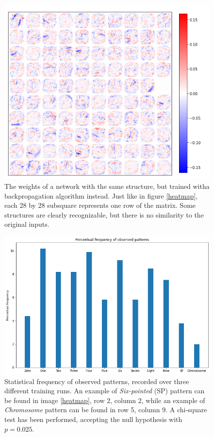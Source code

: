 \documentclass[a4paper]{report}
\begin{document}
\begin{figure} [H]
    \centering
    \includegraphics [width = 12cm] {h/backnet.png}
    \caption{The weights of a network with the same structure, but trained witha backpropagation algorithm instead. Just like in figure \ref{heatmap}, each 28 by 28 subsquare represents one row of the matrix. Some structures are clearly recognizable, but there is no similarity to the original inputs.}
    \label{backnet}
\end{figure}

\begin{figure} [H]
    \centering
    \includegraphics [width=12cm ] {o/bar2.png}
    \caption{Statistical frequency of observed patterns, recorded over three different training runs. An example of \textit{Six-pointed} (SP) pattern can be found in image \ref{heatmap}, row 2, column 2, while an example of \textit{Chromosome} pattern can be found in row 5, column 9. A chi-square test has been performed, accepting the null hypothesis with $p =0.025$.}
    \label{ii_hist}
\end{figure}
\end{document}
